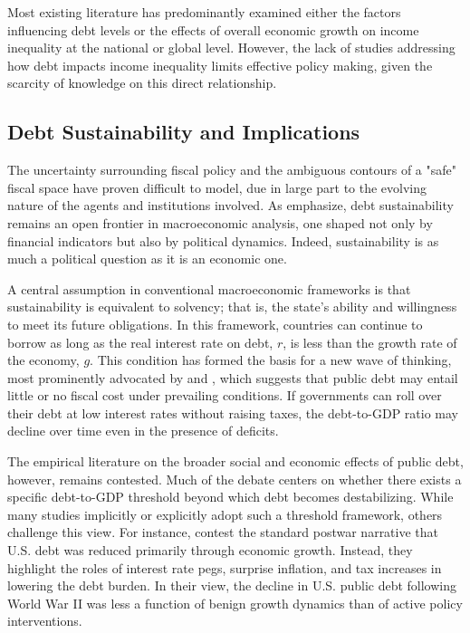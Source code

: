 \documentclass[12pt, titlepage]{article}
\numberwithin{equation}{section}
\begin{document}
	Most existing literature has predominantly examined either the factors influencing debt levels or the effects of overall economic growth on income inequality at the national or global level. However, the lack of studies addressing how debt impacts income inequality limits effective policy making, given the scarcity of knowledge on this direct relationship.

	\subsection{Debt Sustainability and Implications}

	The uncertainty surrounding fiscal policy and the ambiguous contours of a "safe" fiscal space have proven difficult to model, due in large part to the evolving nature of the agents and institutions involved. As \cite{Debrun2019} emphasize, debt sustainability remains an open frontier in macroeconomic analysis, one shaped not only by financial indicators but also by political dynamics. Indeed, sustainability is as much a political question as it is an economic one.

	A central assumption in conventional macroeconomic frameworks is that sustainability is equivalent to solvency; that is, the state’s ability and willingness to meet its future obligations. In this framework, countries can continue to borrow as long as the real interest rate on debt, $r$, is less than the growth rate of the economy, $g$. This condition has formed the basis for a new wave of thinking, most prominently advocated by \cite{Blanchard2019, Blanchard2023} and \cite{FurmanSummers2020}, which suggests that public debt may entail little or no fiscal cost under prevailing conditions. If governments can roll over their debt at low interest rates without raising taxes, the debt-to-GDP ratio may decline over time even in the presence of deficits.

	The empirical literature on the broader social and economic effects of public debt, however, remains contested. Much of the debate centers on whether there exists a specific debt-to-GDP threshold beyond which debt becomes destabilizing. While many studies implicitly or explicitly adopt such a threshold framework, others challenge this view. For instance, \cite{AcalinBall2023} contest the standard postwar narrative that U.S. debt was reduced primarily through economic growth. Instead, they highlight the roles of interest rate pegs, surprise inflation, and tax increases in lowering the debt burden. In their view, the decline in U.S. public debt following World War II was less a function of benign growth dynamics than of active policy interventions.
\end{document}
